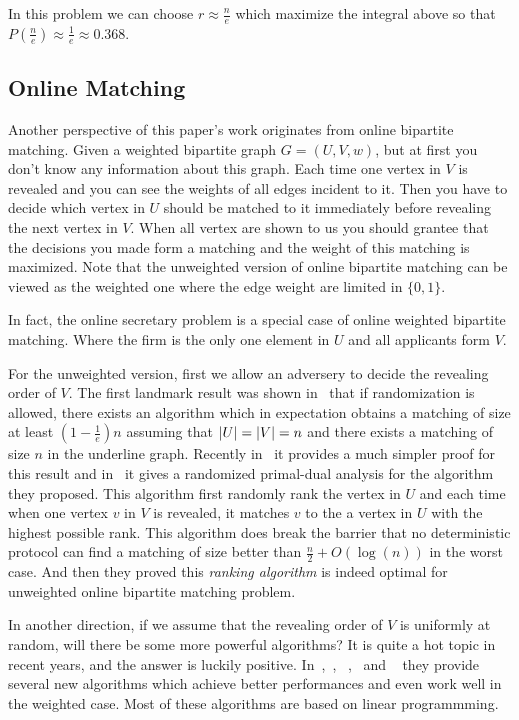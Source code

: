 In this problem we can choose $r \approx \frac{n}{e}$ which maximize the
integral above so that $P(\frac{n}{e}) \approx \frac{1}{e} \approx 0.368$.

\subsection{Online Matching}

Another perspective of this paper's work originates from online bipartite 
matching. Given a weighted bipartite graph $G = (U, V, w)$, but at first
you don't know any information about this graph. 
Each time one vertex in $V$ is revealed and you can see the weights of
all edges incident to it. Then you have to decide which vertex in $U$
should be matched to it immediately before revealing the next vertex in $V$.
When all vertex are shown to us you should grantee that the decisions
you made form a matching and the weight of this matching is maximized.
Note that the unweighted version of online bipartite matching 
can be viewed as the weighted one where the edge weight 
are limited in $\{0, 1\}$.

In fact, the online secretary problem is a special case of online weighted 
bipartite matching. Where the firm is the only one element in $U$ 
and all applicants form $V$.

For the unweighted version, first we allow an adversery to decide the
revealing order of $V$.
The first landmark result was shown in~\cite{karp1990optimal} that if
randomization is allowed, there exists an algorithm which in expectation
obtains a matching of size at least $(1 - \frac{1}{e})n$ assuming that 
$\left\vert U\right\vert = \left\vert V\right\vert = n$ and there exists a matching of size $n$ in the
underline graph. Recently in~\cite{birnbaum2008line} it provides a much
simpler proof for this result and in~\cite{devanur2013randomized} it
gives a randomized primal-dual analysis for the algorithm they proposed.
This algorithm first randomly rank the vertex in $U$ and
each time when one vertex $v$ in $V$ is revealed, it matches $v$ to the
a vertex in $U$ with the highest possible rank.
This algorithm does break the barrier that no deterministic protocol can
find a matching of size better than $\frac{n}{2} + O(\log (n))$ in the 
worst case. And then they proved this \emph{ranking algorithm} is indeed
optimal for unweighted online bipartite matching problem.

In another direction, if we assume that the revealing order of $V$ is
uniformly at random, will there be some more powerful algorithms? 
It is quite a hot topic in recent years, and the answer is luckily 
positive. In~\cite{aggarwal2011online},~\cite{feldman2009online},
~\cite{mahdian2011online},~\cite{mehta2007adwords} and
~\cite{bahmani2010improved} they provide several new algorithms which
achieve better performances and even work well in the weighted case. 
Most of these algorithms are based on linear programmming.

